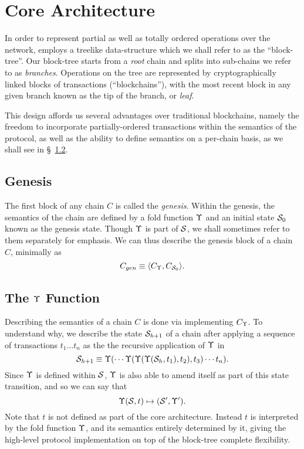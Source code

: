 \section{Core Architecture}

In order to represent partial as well as totally ordered operations over the
network, \oscoin{} employs a treelike data-structure which we shall refer to as
the ``block-tree''.  Our block-tree starts from a \emph{root} chain and splits
into sub-chains we refer to as \emph{branches}.  Operations on the tree are
represented by cryptographically linked blocks of transactions
(``blockchains''), with the most recent block in any given branch known as the
tip of the branch, or \emph{leaf}.

This design affords us several advantages over traditional blockchains, namely
the freedom to incorporate partially-ordered transactions within the semantics
of the protocol, as well as the ability to define semantics on a per-chain
basis, as we shall see in \S~\ref{fold-function}.


\subsection{Genesis}

The first block of any chain $C$ is called the \emph{genesis}. Within the
genesis, the semantics of the chain are defined by a fold function $\Upsilon$ and
an initial state $\mathcal{S}_0$ known as the genesis state. Though $\Upsilon$ is part
of $\mathcal{S}$, we shall sometimes refer to them separately for emphasis.  We can
thus describe the genesis block of a chain $C$, minimally as
\[
    C_{gen} \equiv \langle C_{\Upsilon}, C_{\mathcal{S}_0} \rangle.
\]

\subsection{The $\Upsilon$ Function} \label{fold-function}

Describing the semantics of a chain $C$ is done via implementing $C_{\Upsilon}$.
To understand why, we describe the state $\mathcal{S}_{h+1}$ of a chain after
applying a sequence of transactions $t_1 \dots t_n$ as the the recursive application of $\Upsilon$ in
\[
    \mathcal{S}_{h+1} \equiv \Upsilon(\cdots \Upsilon(\Upsilon(\Upsilon(\mathcal{S}_h,
    t_1), t_2), t_3) \cdots t_n).
\]
Since $\Upsilon$ is defined within $\mathcal{S}$, $\Upsilon$ is also able to amend itself as
part of this state transition, and so we can say that
\[
    \Upsilon(\mathcal{S}, t) \mapsto (\mathcal{S}', \Upsilon').
\]
Note that $t$ is not defined as part of the core architecture. Instead $t$ is
interpreted by the fold function $\Upsilon$, and its semantics entirely determined
by it, giving the high-level protocol implementation on top of the block-tree
complete flexibility.

